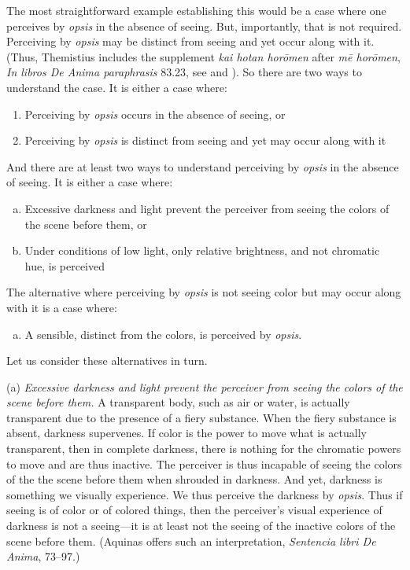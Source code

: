 The most straightforward example establishing this would be a case where one perceives by \emph{opsis} in the absence of seeing. But, importantly, that is not required. Perceiving by \emph{opsis} may be distinct from seeing and yet occur along with it. (Thus, Themistius includes the supplement \emph{kai hotan horōmen} after \emph{mē horōmen}, \emph{In libros De Anima paraphrasis} 83.23, see \citealt[105, 181 n3]{Todd:1996aa} and \citealt[238]{Browne:1986aa}). So there are two ways to understand the case. It is either a case where:
\begin{enumerate}[(1)]
	\item Perceiving by \emph{opsis} occurs in the absence of seeing, or
	\item Perceiving by \emph{opsis} is distinct from seeing and yet may occur along with it
\end{enumerate}
And there are at least two ways to understand perceiving by \emph{opsis} in the absence of seeing. It is either a case where:
\begin{enumerate}[(a)]
	\item Excessive darkness and light prevent the perceiver from seeing the colors of the scene before them, or
	\item Under conditions of low light, only relative brightness, and not chromatic hue, is perceived
\end{enumerate}
The alternative where perceiving by \emph{opsis} is not seeing color but may occur along with it is a case where:
\begin{enumerate}[(c)]
	\item A sensible, distinct from the colors, is perceived by \emph{opsis}.
\end{enumerate}
Let us consider these alternatives in turn.


(a) \emph{Excessive darkness and light prevent the perceiver from seeing the colors of the scene before them.} A transparent body, such as air or water, is actually transparent due to the presence of a fiery substance. When the fiery substance is absent, darkness supervenes. If color is the power to move what is actually transparent, then in complete darkness, there is nothing for the chromatic powers to move and are thus inactive. The perceiver is thus incapable of seeing the colors of the the scene before them when shrouded in darkness. And yet, darkness is something we visually experience. We thus perceive the darkness by \emph{opsis}. Thus if seeing is of color or of colored things, then the perceiver's visual experience of darkness is not a seeing—it is at least not the seeing of the inactive colors of the scene before them. (Aquinas offers such an interpretation, \emph{Sentencia libri De Anima}, 73–97.)

